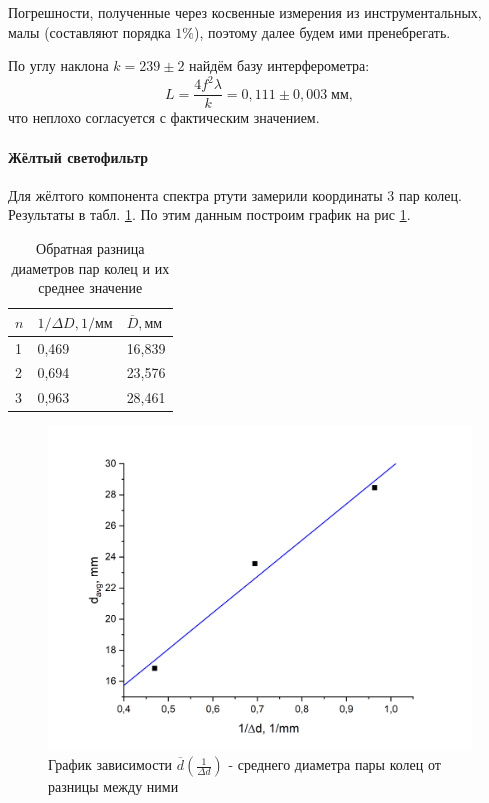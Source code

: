 \documentclass[12pt,a4paper]{extreport}
\begin{document}
Погрешности, полученные через косвенные измерения из инструментальных, малы (составляют порядка  $1\%$), поэтому далее будем ими пренебрегать.

По углу наклона $ k = 239 \pm 2 $ найдём базу интерферометра:
\begin{equation*}\label{key}
	L=\frac{4 f^2 \lambda}{k} = 0,111 \pm 0,003\; мм,
\end{equation*}
что неплохо согласуется с фактическим значением.

\paragraph{Жёлтый светофильтр}

Для жёлтого компонента спектра ртути замерили координаты 3 пар колец. Результаты в табл. \ref{tab:yellowdata}. По этим данным построим график на рис \ref{fig:screenshot4}.

\begin{table}[!h]
	\centering
	\begin{tabular}{|l|l|l|}
		\hline
		$ n $ & $1/\Delta D, 1/мм$ & $\overline{D}, мм$ \\ \hline
		1 & 0,469 & 16,839   \\ \hline
		2 & 0,694 & 23,576  \\ \hline
		3 & 0,963 & 28,461 \\ \hline
	\end{tabular}
	\caption{Обратная разница диаметров пар колец и их среднее значение}
	\label{tab:yellowdata}
\end{table}

\begin{figure}[h]
	\centering
	\includegraphics[width=0.7\linewidth]{2.png}
	\caption{График зависимости $\overline{d}(\frac{1}{\Delta d}) $ - среднего диаметра пары колец от разницы между ними }
	\label{fig:screenshot4}
\end{figure}
\end{document}
